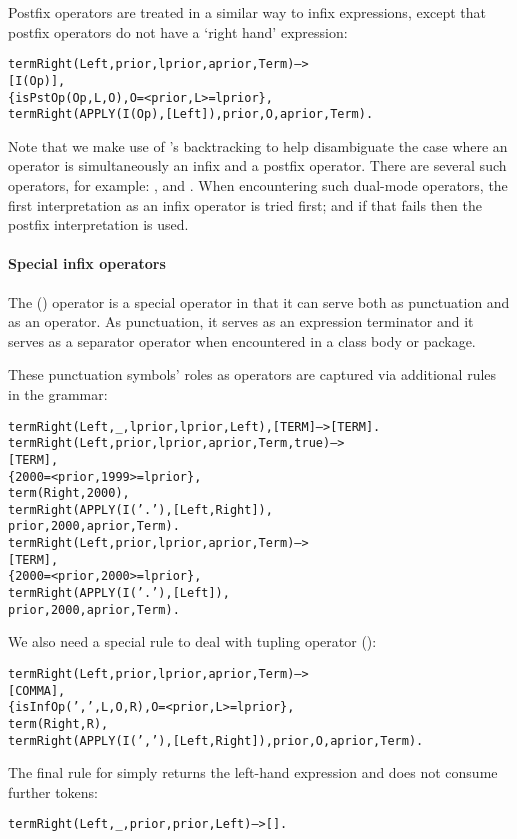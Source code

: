Postfix operators are treated in a similar way to infix expressions, except that postfix operators do not have a `right hand' expression:
\begin{alltt}
termRight(Left,prior,lprior,aprior,Term) -->
    [I(Op)],
    \{ isPstOp(Op,L,O),O=<prior,L>=lprior \},
    termRight(APPLY(I(Op),[Left]),prior,O,aprior,Term).
\end{alltt}
Note that we make use of \go's backtracking to help disambiguate the case where an operator is simultaneously an infix and a postfix operator. There are several such operators, for example: \function{\dotspace}, \q{+} and \q{\uphat}. When encountering such dual-mode operators, the first interpretation as an infix operator is tried first; and if that fails then the postfix interpretation is used.

\paragraph{Special infix operators}     
The \q{\dotspace}() operator is a special operator in that it can serve both as punctuation and as an operator. As punctuation, it serves as an expression terminator and it serves as a separator operator when encountered in a class body or package.

These punctuation symbols' roles as operators are captured via additional rules in the  grammar:
\begin{alltt}
termRight(Left,_,lprior,lprior,Left),[TERM] --> [TERM].
termRight(Left,prior,lprior,aprior,Term,true) --> 
    [TERM],
    \{ 2000=<prior,1999>=lprior \},
    term(Right,2000),
    termRight(APPLY(I('. '),[Left,Right]),
               prior,2000,aprior,Term).
termRight(Left,prior,lprior,aprior,Term) -->
    [TERM],
    \{ 2000=<prior,2000>=lprior \},
    termRight(APPLY(I('. '),[Left]),
      prior,2000,aprior,Term).
\end{alltt}
We also need a special rule to deal with tupling operator \q{,} ():
\begin{alltt}
termRight(Left,prior,lprior,aprior,Term) -->
    [COMMA],
    \{ isInfOp(',',L,O,R),O=<prior,L>=lprior \},
    term(Right,R),
    termRight(APPLY(I(','),[Left,Right]), prior,O,aprior,Term).
\end{alltt}
The final rule for  simply returns the left-hand expression and does not consume further tokens:
\begin{alltt}
termRight(Left,_,prior,prior,Left) --> [].
\end{alltt}

